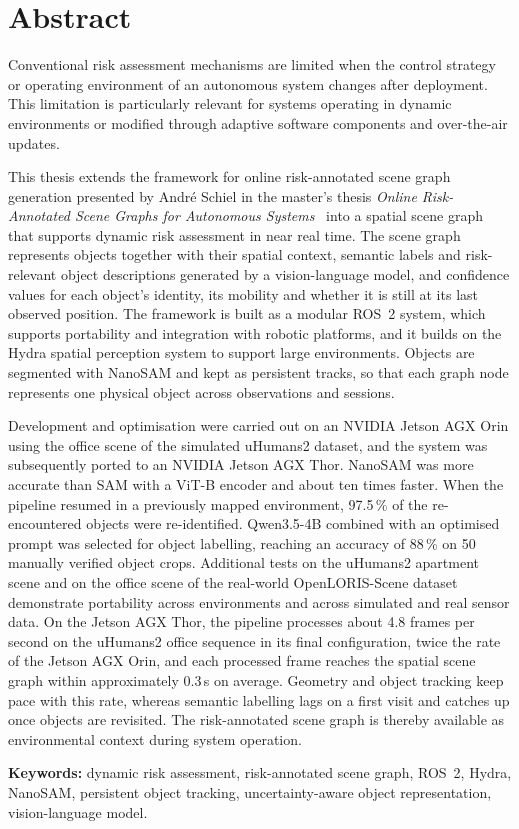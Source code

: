 \chapter*{Abstract}

{\small Conventional risk assessment mechanisms are limited when the control strategy or operating environment of an autonomous system changes after deployment. This limitation is particularly relevant for systems operating in dynamic environments or modified through adaptive software components and over-the-air updates.\par}

{\small This thesis extends the framework for online risk-annotated scene graph generation presented by Andr\'e Schiel in the master's thesis \emph{Online Risk-Annotated Scene Graphs for Autonomous Systems}~\cite{previous_rsg_thesis} into a spatial scene graph that supports dynamic risk assessment in near real time. The scene graph represents objects together with their spatial context, semantic labels and risk-relevant object descriptions generated by a vision-language model, and confidence values for each object's identity, its mobility and whether it is still at its last observed position. The framework is built as a modular ROS~2 system, which supports portability and integration with robotic platforms, and it builds on the Hydra spatial perception system to support large environments. Objects are segmented with NanoSAM and kept as persistent tracks, so that each graph node represents one physical object across observations and sessions.\par}

{\small Development and optimisation were carried out on an NVIDIA Jetson AGX Orin using the office scene of the simulated uHumans2 dataset, and the system was subsequently ported to an NVIDIA Jetson AGX Thor. NanoSAM was more accurate than SAM with a ViT-B encoder and about ten times faster. When the pipeline resumed in a previously mapped environment, 97.5\,\% of the re-encountered objects were re-identified. Qwen3.5-4B combined with an optimised prompt was selected for object labelling, reaching an accuracy of 88\,\% on 50 manually verified object crops. Additional tests on the uHumans2 apartment scene and on the office scene of the real-world OpenLORIS-Scene dataset demonstrate portability across environments and across simulated and real sensor data. On the Jetson AGX Thor, the pipeline processes about 4.8 frames per second on the uHumans2 office sequence in its final configuration, twice the rate of the Jetson AGX Orin, and each processed frame reaches the spatial scene graph within approximately 0.3\,s on average. Geometry and object tracking keep pace with this rate, whereas semantic labelling lags on a first visit and catches up once objects are revisited. The risk-annotated scene graph is thereby available as environmental context during system operation.\par}

\vfill
{\small \noindent\textbf{Keywords:} dynamic risk assessment, risk-annotated scene graph, ROS~2, Hydra, NanoSAM, persistent object tracking, uncertainty-aware object representation, vision-language model.\par}
\vfill